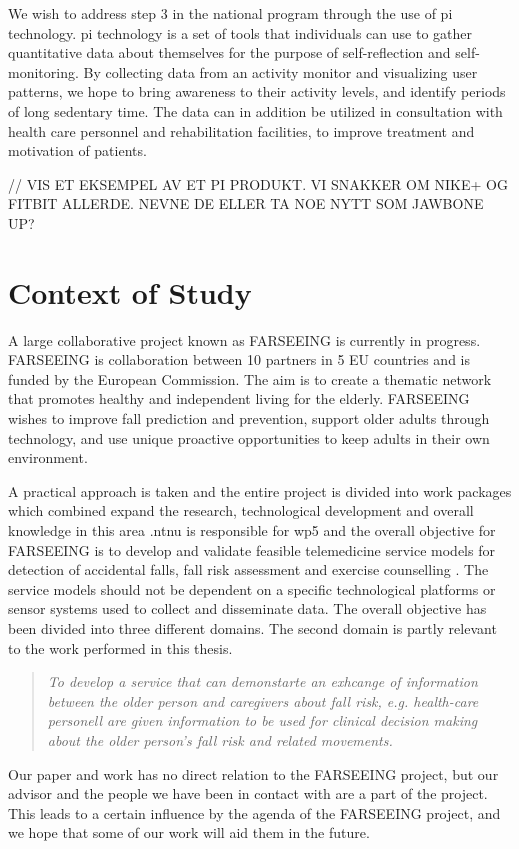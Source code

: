 We wish to address step 3 in the national program through the use of \gls{pi} technology. \gls{pi} technology is a set of tools that individuals can use to gather quantitative data about themselves for the purpose of self-reflection and self-monitoring. By collecting data from an activity monitor and visualizing user patterns,  we hope to bring awareness to their activity levels, and identify periods of long sedentary time. The data can in addition be utilized in consultation with health care personnel and rehabilitation facilities, to improve treatment and motivation of patients.

// VIS ET EKSEMPEL AV ET PI PRODUKT. VI SNAKKER OM NIKE+ OG FITBIT ALLERDE. NEVNE DE ELLER TA NOE NYTT SOM JAWBONE UP?



\section{Context of Study}
A large collaborative project known as FARSEEING is currently in progress. FARSEEING is collaboration between 10 partners in 5 EU countries and is funded by the European Commission. The aim is to create a thematic network that promotes healthy and independent living for the elderly. FARSEEING wishes to improve fall prediction and prevention, support older adults through technology, and use unique proactive opportunities to keep adults in their own environment.

A practical approach is taken and the entire project is divided into work packages which combined expand the research, technological development and overall knowledge in this area \cite{farseeing}.\gls{ntnu} is responsible for \gls{wp5} and the overall objective for FARSEEING is to develop and validate feasible telemedicine service models for detection of accidental falls, fall risk assessment and exercise counselling \cite{wp5}. The service models should not be dependent on a specific technological platforms or sensor systems used to collect and disseminate data. The overall objective has been divided into three different domains. The second domain is partly relevant to the work performed in this thesis.
\begin{quote}
\textit{To develop a service that can demonstarte an exhcange of information between the older person and caregivers about fall risk, e.g. health-care personell are given information to be used for clinical decision making about the older person's fall risk and related movements.}
\end{quote}
Our paper and work has no direct relation to the FARSEEING project, but our advisor and the people we have been in contact with are a part of the project. This leads to a certain influence by the agenda of the FARSEEING project, and we hope that some of our work will aid them in the future.

